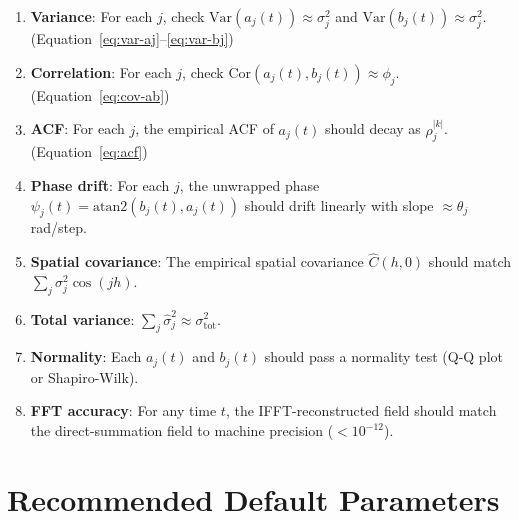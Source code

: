 \documentclass[12pt]{article}
\begin{document}
\begin{enumerate}[label=\textbf{V\arabic*.}]
  \item \textbf{Variance}: For each $j$, check $\mathrm{Var}(a_j(t)) \approx \sigma_j^2$ and $\mathrm{Var}(b_j(t)) \approx \sigma_j^2$. (Equation~\eqref{eq:var-aj}--\eqref{eq:var-bj})
  \item \textbf{Correlation}: For each $j$, check $\mathrm{Cor}(a_j(t), b_j(t)) \approx \phi_j$. (Equation~\eqref{eq:cov-ab})
  \item \textbf{ACF}: For each $j$, the empirical ACF of $a_j(t)$ should decay as $\rho_j^{|k|}$. (Equation~\eqref{eq:acf})
  \item \textbf{Phase drift}: For each $j$, the unwrapped phase $\psi_j(t) = \mathrm{atan2}(b_j(t), a_j(t))$ should drift linearly with slope $\approx \theta_j$ rad/step.
  \item \textbf{Spatial covariance}: The empirical spatial covariance $\hat{C}(h,0)$ should match $\sum_j \sigma_j^2 \cos(jh)$.
  \item \textbf{Total variance}: $\sum_j \hat{\sigma}_j^2 \approx \sigma^2_\mathrm{tot}$.
  \item \textbf{Normality}: Each $a_j(t)$ and $b_j(t)$ should pass a normality test (Q-Q plot or Shapiro-Wilk).
  \item \textbf{FFT accuracy}: For any time $t$, the IFFT-reconstructed field should match the direct-summation field to machine precision ($< 10^{-12}$).
\end{enumerate}

\section{Recommended Default Parameters}
\end{document}
